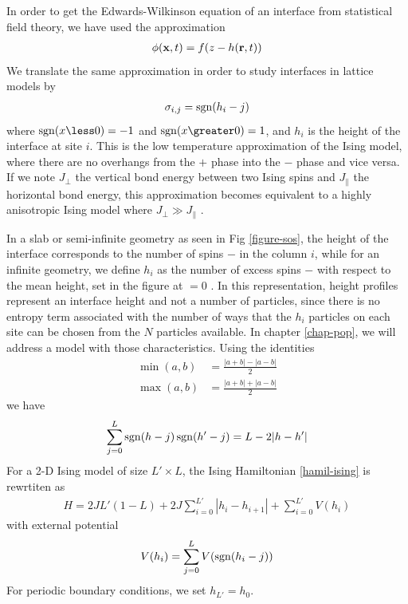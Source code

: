 In order to get the Edwards-Wilkinson equation of an interface from statistical field theory, we have used the approximation 
\begin{align}
\phi({\bf x},t) = f(z-h({\bf r},t))
\end{align}
We translate the same approximation in order to study interfaces in lattice models by
\begin{align}
\sigma_{i,j} = \operatorname{sgn}(h_i-j)
\label{approx-sos}
\end{align}
where $\sgn(x \less 0) = -1$ and $\sgn(x \greater 0) = 1$, and $h_i$ is the height of the interface at site $i$. 
This is the low temperature approximation of the Ising model, where there are no overhangs from the $+$ phase into the $-$ phase and vice versa. If we note $J_\perp$ the vertical bond energy between two Ising spins and $J_\parallel$ the horizontal bond energy, this approximation becomes equivalent to a highly anisotropic Ising model where $J_\perp \gg J_\parallel$ \cite{swendsen_roughening_1977}.

In a slab or semi-infinite geometry as seen in Fig \ref{figure-sos}, the height of the interface corresponds to the number of spins $-$ in the column $i$, while for an infinite geometry, we define $h_i$ as the number of excess spins $-$ with respect to the mean height, set in the figure at $=0$ \cite{van_leeuwen_pinning_1981}. In this representation, height profiles represent an interface height and not a number of particles, since there is no entropy term associated with the number of ways that the $h_i$ particles on each site can be chosen from the $N$ particles available. In chapter \ref{chap-pop}, we will address a model with those characteristics.
Using the identities
\begin{align}
\min(a,b) &= \frac{|a+b| - |a-b|}{2} \\
\max(a,b) &= \frac{|a+b| + |a-b|}{2}
\end{align}
we have
\begin{align}
\sum_{j=0}^L \operatorname{sgn}(h-j)\operatorname{sgn}(h'-j) = L - 2 |h-h'|
\end{align}
For a 2-D Ising model of size $L'\times L$, the Ising Hamiltonian \eqref{hamil-ising} is rewrtiten as
\begin{align}
H = 2 J L' (1-L) +2 J \sum_{i=0}^{L'} |h_i-h_{i+1}| + \sum_{i=0}^{L'} V(h_i)
\label{energie-sos-ising}
\end{align}
with external potential 
\begin{align}
V(h_i) = \sum_{j=0}^L V(\operatorname{sgn}(h_i-j))
\end{align}
For periodic boundary conditions, we set $h_{L'}=h_0$.

